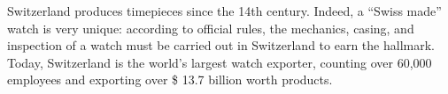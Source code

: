 Switzerland produces timepieces since the 14th century.
Indeed, a ``Swiss made'' watch is very unique: according to official rules, the mechanics, casing, and inspection of a watch must be carried out in Switzerland to earn the hallmark.
Today, Switzerland is the world's largest watch exporter, counting over 60,000 employees and exporting over \$ 13.7 billion worth products.